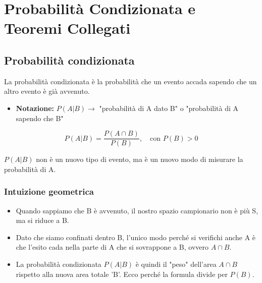 \documentclass[a4paper, 11pt]{article}
\theoremstyle{definition}
\begin{document}
\newpage

\section{Probabilità Condizionata e Teoremi Collegati}

\subsection{Probabilità condizionata}
La probabilità condizionata è la probabilità che un evento accada sapendo che un altro evento è già avvenuto.
\begin{itemize}
    \item \textbf{Notazione:} $P(A|B) \rightarrow$ "probabilità di A dato B" o "probabilità di A sapendo che B"
\end{itemize}

\begin{formulabox}[title={Definizione di Probabilità Condizionata}]
    \[ P(A|B) = \frac{P(A \cap B)}{P(B)}, \quad \text{con } P(B) > 0 \]
\end{formulabox}

$P(A|B)$ non è un nuovo tipo di evento, ma è un nuovo modo di misurare la probabilità di A.

\subsubsection*{Intuizione geometrica}
\begin{center}
\end{center}
\begin{itemize}
    \item Quando sappiamo che B è avvenuto, il nostro spazio campionario non è più S, ma si riduce a B.
    \item Dato che siamo confinati dentro B, l'unico modo perché si verifichi anche A è che l'esito cada nella parte di A che si sovrappone a B, ovvero $A \cap B$.
    \item La probabilità condizionata $P(A|B)$ è quindi il "peso" dell'area $A \cap B$ rispetto alla nuova area totale 'B'. Ecco perché la formula divide per $P(B)$.
\end{itemize}
\end{document}
